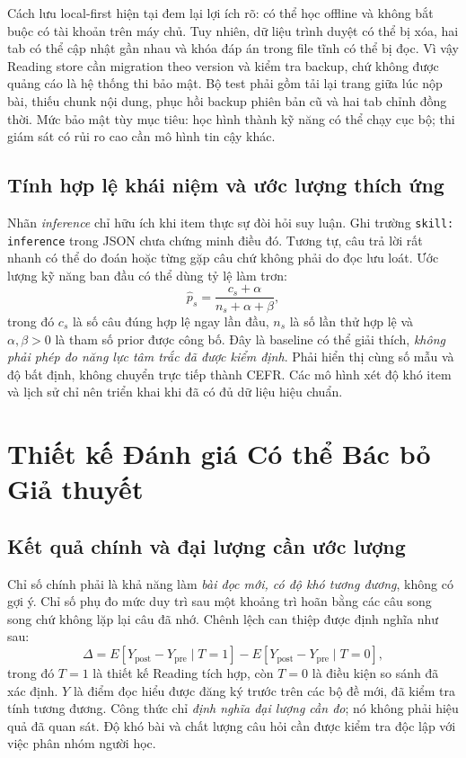 \documentclass[conference,10pt]{IEEEtran}
\begin{document}
Cách lưu local-first hiện tại đem lại lợi ích rõ: có thể học offline và không bắt buộc có tài khoản trên máy chủ. Tuy nhiên, dữ liệu trình duyệt có thể bị xóa, hai tab có thể cập nhật gần nhau và khóa đáp án trong file tĩnh có thể bị đọc. Vì vậy Reading store cần migration theo version và kiểm tra backup, chứ không được quảng cáo là hệ thống thi bảo mật. Bộ test phải gồm tải lại trang giữa lúc nộp bài, thiếu chunk nội dung, phục hồi backup phiên bản cũ và hai tab chỉnh đồng thời. Mức bảo mật tùy mục tiêu: học hình thành kỹ năng có thể chạy cục bộ; thi giám sát có rủi ro cao cần mô hình tin cậy khác.

\subsection{Tính hợp lệ khái niệm và ước lượng thích ứng}
Nhãn \emph{inference} chỉ hữu ích khi item thực sự đòi hỏi suy luận. Ghi trường \texttt{skill: inference} trong JSON chưa chứng minh điều đó. Tương tự, câu trả lời rất nhanh có thể do đoán hoặc từng gặp câu chứ không phải do đọc lưu loát. Ước lượng kỹ năng ban đầu có thể dùng tỷ lệ làm trơn:
\begin{equation}
\widehat{p}_{s}=\frac{c_s+\alpha}{n_s+\alpha+\beta},
\label{eq:mastery}
\end{equation}
trong đó $c_s$ là số câu đúng hợp lệ ngay lần đầu, $n_s$ là số lần thử hợp lệ và $\alpha,\beta>0$ là tham số prior được công bố. Đây là baseline có thể giải thích, \emph{không phải phép đo năng lực tâm trắc đã được kiểm định}. Phải hiển thị cùng số mẫu và độ bất định, không chuyển trực tiếp thành CEFR. Các mô hình xét độ khó item và lịch sử chỉ nên triển khai khi đã có đủ dữ liệu hiệu chuẩn.

\section{Thiết kế Đánh giá Có thể Bác bỏ Giả thuyết}
\subsection{Kết quả chính và đại lượng cần ước lượng}
Chỉ số chính phải là khả năng làm \emph{bài đọc mới, có độ khó tương đương}, không có gợi ý. Chỉ số phụ đo mức duy trì sau một khoảng trì hoãn bằng các câu song song chứ không lặp lại câu đã nhớ. Chênh lệch can thiệp được định nghĩa như sau:
\begin{equation}
\Delta=E[Y_{\mathrm{post}}-Y_{\mathrm{pre}}\mid T=1]-E[Y_{\mathrm{post}}-Y_{\mathrm{pre}}\mid T=0],
\label{eq:estimand}
\end{equation}
trong đó $T=1$ là thiết kế Reading tích hợp, còn $T=0$ là điều kiện so sánh đã xác định. $Y$ là điểm đọc hiểu được đăng ký trước trên các bộ đề mới, đã kiểm tra tính tương đương. Công thức chỉ \emph{định nghĩa đại lượng cần đo}; nó không phải hiệu quả đã quan sát. Độ khó bài và chất lượng câu hỏi cần được kiểm tra độc lập với việc phân nhóm người học.
\end{document}
